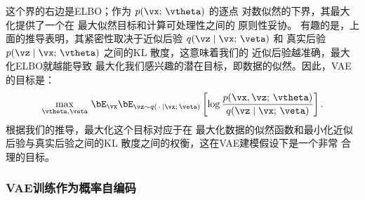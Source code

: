 \documentclass[../../book-main_zh.tex]{subfiles}
\begin{document}
这个界的右边是ELBO；作为 $p(\vx;\, \vtheta)$ 的逐点
对数似然的下界，其最大化提供了一个在
最大似然目标和计算可处理性之间的
原则性妥协。
有趣的是，上面的推导表明，其紧密性取决于近似后验 $q(\vz \mid \vx;\, \veta)$ 和
真实后验 $p(\vz \mid \vx;\, \vtheta)$ 之间的KL
散度，这意味着我们的
近似后验越准确，最大化ELBO就越能导致
最大化我们感兴趣的潜在目标，即数据的似然。因此，VAE的目标是：
\begin{equation}\label{eq:elbo-objective}
\max_{\vtheta, \veta}\,
\bE_{\vx}
\bE_{\vz \sim q(\,\cdot\, \mid \vx ;\, \veta)} \left[
  \log \frac{p(\vx, \vz;\, \vtheta)}{q(\vz \mid \vx;\, \veta)}
\right].
\end{equation}
根据我们的推导，最大化这个目标对应于在
最大化数据的似然函数和最小化近似后验与真实后验之间的KL
散度之间的权衡，这在VAE建模假设下是一个非常
合理的目标。

\subsubsection{VAE训练作为概率自编码}
\end{document}
